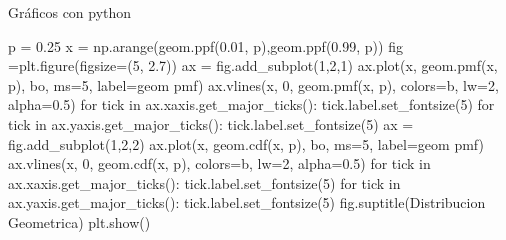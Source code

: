 \documentclass[
  ignorenonframetext,
  aspectratio=169]{beamer}
\newenvironment{Shaded}{\begin{snugshade}}{\end{snugshade}}
\newcommand{\ControlFlowTok}[1]{\textcolor[rgb]{0.00,0.23,0.31}{#1}}
\newcommand{\DecValTok}[1]{\textcolor[rgb]{0.68,0.00,0.00}{#1}}
\newcommand{\FloatTok}[1]{\textcolor[rgb]{0.68,0.00,0.00}{#1}}
\newcommand{\KeywordTok}[1]{\textcolor[rgb]{0.00,0.23,0.31}{#1}}
\newcommand{\NormalTok}[1]{\textcolor[rgb]{0.00,0.23,0.31}{#1}}
\newcommand{\OperatorTok}[1]{\textcolor[rgb]{0.37,0.37,0.37}{#1}}
\newcommand{\StringTok}[1]{\textcolor[rgb]{0.13,0.47,0.30}{#1}}
\begin{document}
\begin{frame}[fragile]{Gráficos con python}
\protect\hypertarget{gruxe1ficos-con-python}{}
\begin{Shaded}
\begin{Highlighting}[]
\NormalTok{p }\OperatorTok{=} \FloatTok{0.25}
\NormalTok{x }\OperatorTok{=}\NormalTok{ np.arange(geom.ppf(}\FloatTok{0.01}\NormalTok{, p),geom.ppf(}\FloatTok{0.99}\NormalTok{, p))}
\NormalTok{fig }\OperatorTok{=}\NormalTok{plt.figure(figsize}\OperatorTok{=}\NormalTok{(}\DecValTok{5}\NormalTok{, }\FloatTok{2.7}\NormalTok{))}
\NormalTok{ax }\OperatorTok{=}\NormalTok{ fig.add\_subplot(}\DecValTok{1}\NormalTok{,}\DecValTok{2}\NormalTok{,}\DecValTok{1}\NormalTok{)}
\NormalTok{ax.plot(x, geom.pmf(x, p), }\StringTok{\textquotesingle{}bo\textquotesingle{}}\NormalTok{, ms}\OperatorTok{=}\DecValTok{5}\NormalTok{, label}\OperatorTok{=}\StringTok{\textquotesingle{}geom pmf\textquotesingle{}}\NormalTok{)}
\NormalTok{ax.vlines(x, }\DecValTok{0}\NormalTok{, geom.pmf(x, p), colors}\OperatorTok{=}\StringTok{\textquotesingle{}b\textquotesingle{}}\NormalTok{, lw}\OperatorTok{=}\DecValTok{2}\NormalTok{, alpha}\OperatorTok{=}\FloatTok{0.5}\NormalTok{)}
\ControlFlowTok{for}\NormalTok{ tick }\KeywordTok{in}\NormalTok{ ax.xaxis.get\_major\_ticks():}
\NormalTok{  tick.label.set\_fontsize(}\DecValTok{5}\NormalTok{)}
\ControlFlowTok{for}\NormalTok{ tick }\KeywordTok{in}\NormalTok{ ax.yaxis.get\_major\_ticks():}
\NormalTok{  tick.label.set\_fontsize(}\DecValTok{5}\NormalTok{) }
\NormalTok{ax }\OperatorTok{=}\NormalTok{ fig.add\_subplot(}\DecValTok{1}\NormalTok{,}\DecValTok{2}\NormalTok{,}\DecValTok{2}\NormalTok{)}
\NormalTok{ax.plot(x, geom.cdf(x, p), }\StringTok{\textquotesingle{}bo\textquotesingle{}}\NormalTok{, ms}\OperatorTok{=}\DecValTok{5}\NormalTok{, label}\OperatorTok{=}\StringTok{\textquotesingle{}geom pmf\textquotesingle{}}\NormalTok{)}
\NormalTok{ax.vlines(x, }\DecValTok{0}\NormalTok{, geom.cdf(x, p), colors}\OperatorTok{=}\StringTok{\textquotesingle{}b\textquotesingle{}}\NormalTok{, lw}\OperatorTok{=}\DecValTok{2}\NormalTok{, alpha}\OperatorTok{=}\FloatTok{0.5}\NormalTok{)}
\ControlFlowTok{for}\NormalTok{ tick }\KeywordTok{in}\NormalTok{ ax.xaxis.get\_major\_ticks():}
\NormalTok{  tick.label.set\_fontsize(}\DecValTok{5}\NormalTok{)}
\ControlFlowTok{for}\NormalTok{ tick }\KeywordTok{in}\NormalTok{ ax.yaxis.get\_major\_ticks():}
\NormalTok{  tick.label.set\_fontsize(}\DecValTok{5}\NormalTok{)}
\NormalTok{fig.suptitle(}\StringTok{\textquotesingle{}Distribucion Geometrica\textquotesingle{}}\NormalTok{)}
\NormalTok{plt.show()}
\end{Highlighting}
\end{Shaded}
\end{frame}
\end{document}
